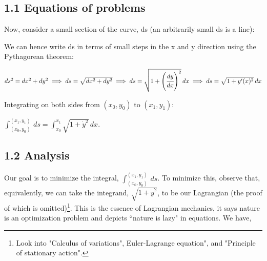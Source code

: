 \documentclass[hidelinks, 11pt]{article}
\newcommand{\Lagr}{\mathcal{L}}
\begin{document}
\subsection*{1.1 Equations of problems}

\begin{center}
\end{center}


\noindent Now, consider a small section of the curve, ds (an arbitrarily small ds is a line):

\begin{center}
\end{center}

We can hence write ds in terms of small steps in the x and y direction using the Pythagorean theorem:\newline 

  $ds^2 = dx^2 + dy^2 \implies ds = \sqrt{dx^2 + dy^2} \implies ds = \sqrt{1 + \left(\cfrac{dy}{dx} \right)^2}\,dx \implies ds = \sqrt{1 + y'(x)^2}\,dx $

Integrating on both sides from $(x_0, y_0)$ to $(x_1, y_1)$:

  $\displaystyle\int_{(x_0, y_0)}^{(x_1, y_1)} \,ds = \int_{x_0}^{x_1} \sqrt{1 + \dot{y}^2}\,dx$.


\subsection*{1.2 Analysis}
Our goal is to minimize the integral, $\displaystyle\int_{(x_0, y_0)}^{(x_1, y_1)} \,ds$.
To minimize this, observe that, equivalently, we can take the integrand, $\sqrt{1 + \dot{y}^2}$, to be our Lagrangian (the proof of which is omitted)\footnote[1]{Look into "Calculus of variations", Euler-Lagrange equation", and "Principle of stationary action".}. This is the essence of Lagrangian mechanics, it says nature is an optimization problem and depicts ``nature is lazy" in equations. We have, 
\end{document}
